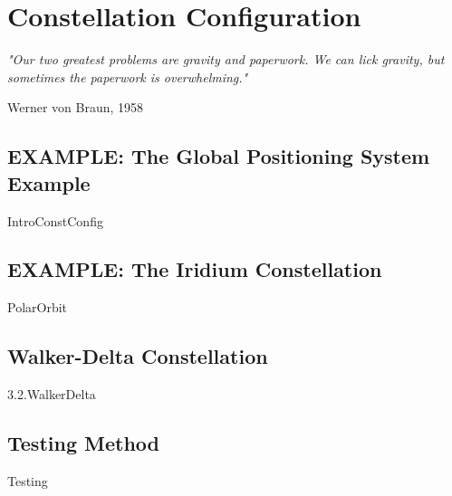 \chapter{Constellation Configuration}

\epigraph{\textit{"Our two greatest problems are gravity and paperwork. We can lick gravity, but sometimes the paperwork is overwhelming."}}{Werner von Braun, 1958} 
\newpage
\section{EXAMPLE: The Global Positioning System Example}
{IntroConstConfig}
\newpage
\section{EXAMPLE: The Iridium Constellation}
{PolarOrbit}

\section{Walker-Delta Constellation}
{3.2.WalkerDelta}

\section{Testing Method}
{Testing}
